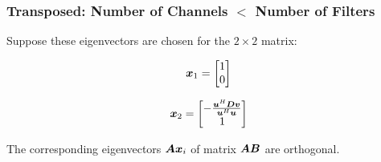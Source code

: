 \documentclass{article}
\begin{document}
\subsubsection{Transposed: Number of Channels $<$ Number of Filters}
Suppose these eigenvectors are chosen for the $2 \times 2$ matrix:

\begin{equation}
\bm{x}_1 = \begin{bmatrix}
1 \\
0
\end{bmatrix}
\end{equation}

\begin{equation}
\bm{x}_2 = \begin{bmatrix}
-\frac{\bm{u}^H\bm{D}\bm{v}}{\bm{u}^H\bm{u}} \\
1
\end{bmatrix}
\end{equation}

The corresponding eigenvectors $\bm{A}\bm{x}_i$ of matrix $\bm{A}\bm{B}$ are orthogonal.
\end{document}
